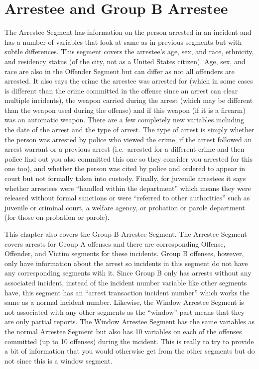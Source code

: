 \documentclass[
]{krantz}
\begin{document}
\chapter{Arrestee and Group B Arrestee}\label{arrestee}

The Arrestee Segment has information on the person arrested
in an incident and has a number of variables that look at
same as in previous segments but with subtle differences.
This segment covers the arrestee's age, sex, and race,
ethnicity, and residency status (of the city, not as a
United States citizen). Age, sex, and race are also in the
Offender Segment but can differ as not all offenders are
arrested. It also says the crime the arrestee was arrested
for (which in some cases is different than the crime
committed in the offense since an arrest can clear multiple
incidents), the weapon carried during the arrest (which may
be different than the weapon used during the offense) and if
this weapon (if it is a firearm) was an automatic weapon.
There are a few completely new variables including the date
of the arrest and the type of arrest. The type of arrest is
simply whether the person was arrested by police who viewed
the crime, if the arrest followed an arrest warrant or a
previous arrest (i.e.~arrested for a different crime and
then police find out you also committed this one so they
consider you arrested for this one too), and whether the
person was cited by police and ordered to appear in court
but not formally taken into custody. Finally, for juvenile
arrestees it says whether arrestees were ``handled within
the department'' which means they were released without
formal sanctions or were ``referred to other authorities''
such as juvenile or criminal court, a welfare agency, or
probation or parole department (for those on probation or
parole).

This chapter also covers the Group B Arrestee Segment. The
Arrestee Segment covers arrests for Group A offenses and
there are corresponding Offense, Offender, and Victim
segments for these incidents. Group B offenses, however,
only have information about the arrest so incidents in this
segment do not have any corresponding segments with it.
Since Group B only has arrests without any associated
incident, instead of the incident number variable like other
segments have, this segment has an ``arrest transaction
incident number'' which works the same as a normal incident
number. Likewise, the Window Arrestee Segment is not
associated with any other segments as the ``window'' part
means that they are only partial reports. The Window
Arrestee Segment has the same variables as the normal
Arrestee Segment but also has 10 variables on each of the
offenses committed (up to 10 offenses) during the incident.
This is really to try to provide a bit of information that
you would otherwise get from the other segments but do not
since this is a window segment.
\end{document}
